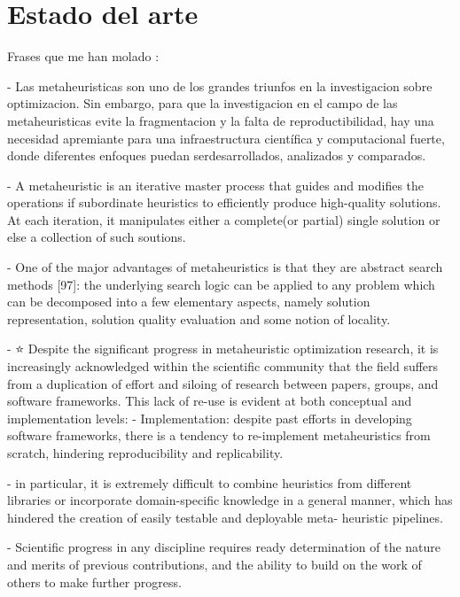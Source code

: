 \chapter{Estado del arte}

Frases que me han molado
\cite{arXiv:2011.09821} :

- Las metaheuristicas son uno de los grandes triunfos en la investigacion sobre optimizacion. Sin embargo, para que la investigacion
en el campo de las metaheuristicas evite la fragmentacion y la falta de reproductibilidad, hay una necesidad apremiante para
una infraestructura científica y computacional fuerte, donde diferentes enfoques puedan serdesarrollados, analizados y
comparados.

- A metaheuristic is an iterative master process that guides and modifies the operations if subordinate heuristics to
efficiently produce high-quality solutions. At each iteration, it manipulates either a complete(or partial) single solution
or else a collection of such soutions.

- One of the major advantages of metaheuristics is that they are abstract search methods [97]: the underlying search logic can be
applied to any problem which can be decomposed into a few elementary aspects, namely solution representation,
solution quality evaluation and some notion of locality.

- ⭐ Despite the significant progress in metaheuristic optimization research, it is increasingly acknowledged within
the scientific community that the field suffers from a duplication of effort and siloing of research between papers,
groups, and software frameworks. This lack of re-use is evident at both conceptual and implementation levels:
 - Implementation: despite past efforts in developing software frameworks, there is a tendency to re-implement
metaheuristics from scratch, hindering reproducibility and replicability.

-  in particular, it is extremely difficult to combine heuristics from different libraries or incorporate domain-specific
knowledge in a general manner, which has hindered the creation of easily testable and deployable meta- heuristic pipelines.

- Scientific progress in any discipline requires ready determination of the nature and merits of previous contributions,
and the ability to build on the work of others to make further progress.